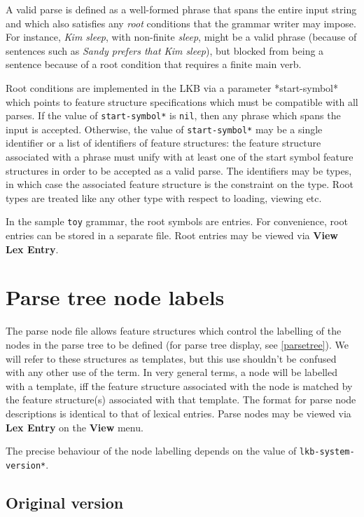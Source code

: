 \documentclass[12pt]{report}
\begin{document}
A valid parse is defined as a well-formed phrase that spans the entire
input string and which also satisfies any {\it root} conditions
that the grammar writer may impose.  For instance,  {\it Kim sleep},
with non-finite {\it sleep},
might be a valid phrase (because
of sentences such as {\it Sandy prefers that Kim sleep}), but blocked
from being a sentence because of a root condition that requires a finite
main verb.  

Root conditions are implemented in the LKB via a
parameter *start-symbol* which points to feature structure specifications
which must be compatible with all parses.  If the value of {\tt *start-symbol*}
is {\tt nil}, then any phrase which spans the input is accepted.
Otherwise,
the value of {\tt *start-symbol*}
may be a single identifier or a list of identifiers of feature
structures: the feature structure associated with a phrase must unify
with at least one of the start symbol feature structures in order
to be accepted as a valid parse.  The identifiers may be types, in which
case the associated feature structure is the constraint on the
type.  Root types are treated like any other type with respect to loading,
viewing etc.
 
In the sample {\tt toy} grammar, the root symbols are 
entries.  For convenience, root entries
can be stored in a separate file.
Root entries may be viewed via {\bf View} 
{\bf Lex Entry}.

\section{Parse tree node labels}
\label{treenodes}

The parse node file allows feature structures which control the
labelling of the nodes in the
parse tree to be defined (for parse tree display, see \ref{parsetree}).
We will refer to these structures as templates, but this use 
shouldn't be confused with any other use of the term.
In very general terms,
a node will be labelled with a template, iff the feature
structure associated with the node is matched by the feature
structure(s) associated with that template.
The format for parse node descriptions is
identical to that of lexical entries.  Parse nodes may be viewed via 
{\bf Lex Entry} on the {\bf View} menu.

The precise behaviour of the node labelling depends on
the value of {\tt *lkb-system-version*}.  

\subsection{Original version}
\end{document}
